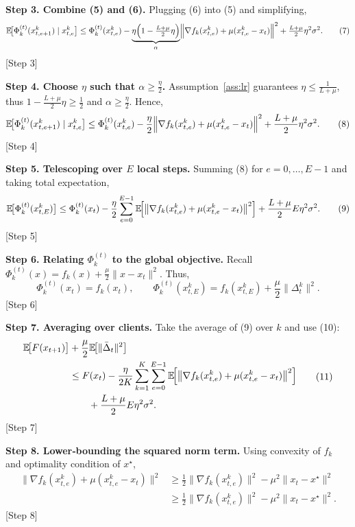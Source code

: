 \documentclass{article}
\newcommand{\EE}{\mathbb{E}}
\newcommand{\prox}{\mu}
\begin{document}
\noindent\textbf{Step 3. Combine (5) and (6).}
Plugging (6) into (5) and simplifying,
\[
\EE\!\bigl[\Phi_k^{(t)}(x_{t,e+1}^{k})\mid x_{t,e}^{k}\bigr]
\le
\Phi_k^{(t)}(x_{t,e}^{k})
-\underbrace{\eta\Bigl(1-\tfrac{L+\prox}{2}\eta\Bigr)}_{\alpha}
\Bigl\|\nabla f_k(x_{t,e}^{k})+\prox(x_{t,e}^{k}-x_t)\Bigr\|^{2}
+\tfrac{L+\prox}{2}\eta^{2}\sigma^{2}.
\tag{7}
\] 
[Step 3]

\noindent\textbf{Step 4. Choose $\eta$ such that $\alpha\ge\frac{\eta}{2}$.}
Assumption~\ref{ass:lr} guarantees $\eta\le\frac{1}{L+\prox}$, thus
$1-\frac{L+\prox}{2}\eta\ge\frac12$ and $\alpha\ge\frac{\eta}{2}$.
Hence,
\[
\EE\!\bigl[\Phi_k^{(t)}(x_{t,e+1}^{k})\mid x_{t,e}^{k}\bigr]
\le
\Phi_k^{(t)}(x_{t,e}^{k})
-\frac{\eta}{2}
\Bigl\|\nabla f_k(x_{t,e}^{k})+\prox(x_{t,e}^{k}-x_t)\Bigr\|^{2}
+\frac{L+\prox}{2}\eta^{2}\sigma^{2}.
\tag{8}
\] 
[Step 4]

\noindent\textbf{Step 5. Telescoping over $E$ local steps.}
Summing (8) for $e=0,\dots ,E-1$ and taking total expectation,
\[
\EE\!\bigl[\Phi_k^{(t)}(x_{t,E}^{k})\bigr]
\le
\Phi_k^{(t)}(x_t)
-\frac{\eta}{2}\sum_{e=0}^{E-1}
\EE\!\Bigl[\bigl\|\nabla f_k(x_{t,e}^{k})+\prox(x_{t,e}^{k}-x_t)\bigr\|^{2}\Bigr]
+\frac{L+\prox}{2}E\eta^{2}\sigma^{2}.
\tag{9}
\] 
[Step 5]

\noindent\textbf{Step 6. Relating $\Phi_k^{(t)}$ to the global objective.}
Recall $\Phi_k^{(t)}(x)=f_k(x)+\frac{\prox}{2}\|x-x_t\|^{2}$.
Thus,
\[
\Phi_k^{(t)}(x_t)=f_k(x_t),\qquad
\Phi_k^{(t)}(x_{t,E}^{k})=f_k(x_{t,E}^{k})+\frac{\prox}{2}\|\Delta_{t}^{k}\|^{2}.
\tag{10}
\] 
[Step 6]

\noindent\textbf{Step 7. Averaging over clients.}
Take the average of (9) over $k$ and use (10):
\[
\begin{aligned}
\EE\!\bigl[F(x_{t+1})\bigr]
&+\frac{\prox}{2}\EE\!\bigl[\|\bar\Delta_t\|^{2}\bigr]
\\
&\le
F(x_t)
-\frac{\eta}{2K}\sum_{k=1}^{K}\sum_{e=0}^{E-1}
\EE\!\Bigl[\bigl\|\nabla f_k(x_{t,e}^{k})+\prox(x_{t,e}^{k}-x_t)\bigr\|^{2}\Bigr]
\\
&\qquad+\frac{L+\prox}{2}E\eta^{2}\sigma^{2}.
\end{aligned}
\tag{11}
\] 
[Step 7]

\noindent\textbf{Step 8. Lower‑bounding the squared norm term.}
Using convexity of $f_k$ and optimality condition of $x^\star$,
\[
\begin{aligned}
\bigl\|\nabla f_k(x_{t,e}^{k})+\prox(x_{t,e}^{k}-x_t)\bigr\|^{2}
&\ge
\frac12\|\nabla f_k(x_{t,e}^{k})\|^{2}
-\prox^{2}\|x_t-x^\star\|^{2}
\\
&\ge
\frac12\|\nabla f_k(x_{t,e}^{k})\|^{2}
-\prox^{2}\|x_t-x^\star\|^{2}.
\end{aligned}
\tag{12}
\] 
[Step 8]
\end{document}
